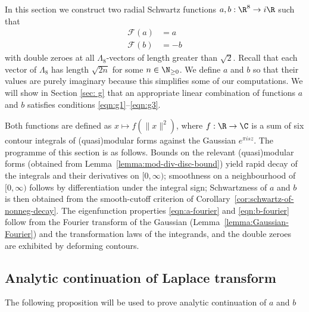 In this section we construct two radial Schwartz functions $a,b:\R^8\to i\R$ such that
\begin{align}\mathcal{F}(a)&=a\label{eqn:a-fourier}\\
    \mathcal{F}(b)&=-b\label{eqn:b-fourier}
\end{align}
with double zeroes at all $\Lambda_8$-vectors of length greater than $\sqrt{2}$. Recall that each vector of $\Lambda_8$ has length $\sqrt{2n}$ for some $n\in\N_{\geq 0}$.
We define $a$ and $b$ so that their values are purely imaginary because this simplifies some of our computations.
We will show in Section \ref{sec: g} that an appropriate linear combination of functions $a$ and $b$ satisfies conditions \eqref{eqn:g1}--\eqref{eqn:g3}.

Both functions are defined as $x \mapsto f(\|x\|^2)$, where $f : \R \to \C$ is a sum of six contour integrals of (quasi)modular forms against the Gaussian $e^{\pi i s z}$. The programme of this section is as follows. Bounds on the relevant (quasi)modular forms (obtained from Lemma~\ref{lemma:mod-div-disc-bound}) yield rapid decay of the integrals and their derivatives on $[0, \infty)$; smoothness on a neighbourhood of $[0,\infty)$ follows by differentiation under the integral sign; Schwartzness of $a$ and $b$ is then obtained from the smooth-cutoff criterion of Corollary~\ref{cor:schwartz-of-nonneg-decay}. The eigenfunction properties \eqref{eqn:a-fourier} and \eqref{eqn:b-fourier} follow from the Fourier transform of the Gaussian (Lemma~\ref{lemma:Gaussian-Fourier}) and the transformation laws of the integrands, and the double zeroes are exhibited by deforming contours.

\subsection{Analytic continuation of Laplace transform}

The following proposition will be used to prove analytic continuation of $a$ and $b$

